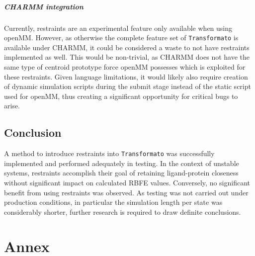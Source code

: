 \documentclass[oneside]{scrreprt}
\begin{document}
\paragraph{CHARMM integration} Currently, restraints are an experimental feature only available when using openMM. However, as otherwise the complete feature set of \texttt{Transformato} is available under CHARMM, it could be considered a waste to not have restraints implemented as well. This would be non-trivial, as CHARMM does not have the same type of centroid prototype force openMM possesses which is exploited for these restraints. Given language limitations, it would likely also require creation of dynamic simulation scripts during the submit stage instead of the static script used for openMM, thus creating a significant opportunity for critical bugs to arise.

\section{Conclusion}
A method to introduce restraints into \texttt{Transformato} was successfully implemented and performed adequately in testing. In the context of unstable systems, restraints accomplish their goal of retaining ligand-protein closeness without significant impact on calculated RBFE values. Conversely, no significant benefit from using restraints was observed. As testing was not carried out under production conditions, in particular the simulation length per state was considerably shorter, further research is required to draw definite conclusions.
\chapter{Annex}
\end{document}
